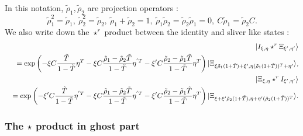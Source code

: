 \documentclass[12pt,a4paper]{article}
\def\T{{\tilde T}}
\begin{document}
In this notation, ${\tilde \rho}_1,{\tilde \rho}_2$ are projection operators :
\begin{equation}
{\tilde \rho}_1^2={\tilde \rho}_1,\ {\tilde \rho}_2^2={\tilde \rho}_2,\ {\tilde \rho}_1+{\tilde \rho}_2=1,\ {\tilde \rho}_1{\tilde \rho}_2={\tilde \rho}_2 {\tilde \rho}_1=0,\ C{\tilde \rho}_1={\tilde \rho}_2 C.
\end{equation}
We also write down the $\star^r$ product between the identity and sliver like states :
\begin{eqnarray}
&&|I_{\xi,\eta}\star^r\Xi_{\xi',\eta'}\rangle\nonumber \\
&&=\exp\left(-\xi C{\T\over1-\T }\eta^T-\xi C{{\tilde \rho}_1-{\tilde \rho}_2\T \over1-\T }\eta^{'T}-\xi'C{{\tilde \rho}_2-{\tilde \rho}_1\T \over1-\T }\eta^T\right)|\Xi_{\xi{\tilde \rho}_1(1+\T )+\xi',\eta({\tilde \rho}_1(1+\T ))^T+\eta'}\rangle,\nonumber \\
&&|\Xi_{\xi,\eta}\star^rI_{\xi',\eta'}\rangle\nonumber \\
&&=\exp\left(-\xi'C{\T \over1-\T }\eta^{'T}-\xi C{{\tilde \rho}_1-{\tilde \rho}_2\T \over1-\T }\eta^{'T}-\xi'C{{\tilde \rho}_2-{\tilde \rho}_1\T \over1-\T }\eta^T\right)|\Xi_{\xi+\xi'{\tilde \rho}_2(1+\T ),\eta+\eta'({\tilde \rho}_2(1+\T ))^T}\rangle.\nonumber \\
\end{eqnarray}



\subsubsection{The $\star$ product in ghost part}
\end{document}
